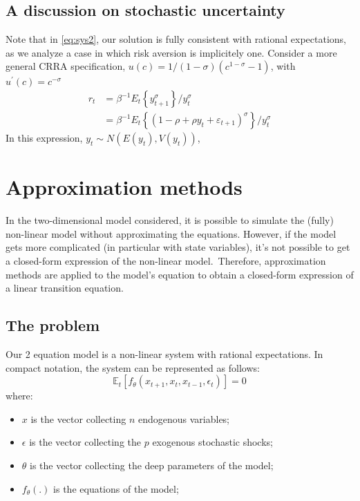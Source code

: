 \documentclass[a4paper,12pt]{article}%
\begin{document}
\subsection{A discussion on stochastic uncertainty}

Note that in \autoref{eq:sys2}, our solution is fully consistent with rational
expectations, as we analyze a case in which risk aversion is implicitely one.
Consider a more general CRRA specification, $u\left(  c\right)  =1/\left(
1-\sigma\right)  \left(  c^{1-\sigma}-1\right)  $, with $u^{\prime}\left(
c\right)  =c^{-\sigma}$
\begin{align*}
r_{t}  & =\beta^{-1}E_{t}\left\{  y_{t+1}^{\sigma}\right\}  /y_{t}^{\sigma}\\
& =\beta^{-1}E_{t}\left\{  \left(  1-\rho+\rho y_{t}+\varepsilon_{t+1}\right)
^{\sigma}\right\}  /y_{t}^{\sigma}%
\end{align*}
In this expression, $y_{t}\sim N(E\left(  y_{t}\right)  ,V\left(
y_{t}\right)  )$,
\[
\]


\newpage

\section{Approximation methods}

In the two-dimensional model considered, it is possible to simulate the
(fully) non-linear model without approximating the equations. However, if the
model gets more complicated (in particular with state variables), it's not
possible to get a closed-form expression of the non-linear model.\ Therefore,
approximation methods are applied to the model's equation to obtain a
closed-form expression of a linear transition equation.

\subsection{The problem}

Our 2 equation model is a non-linear system with rational expectations. In
compact notation, the system can be represented as follows:%
\begin{equation}
\mathbb{E}_{t}\left[  f_{\theta}\left(  x_{t+1},x_{t},x_{t-1},\epsilon
_{t}\right)  \right]  =0 \label{eq non linear system}%
\end{equation}
where:

\begin{itemize}
\item $x$ is the vector collecting $n$ endogenous variables;

\item $\epsilon$ is the vector collecting the $p$ exogenous stochastic shocks;

\item $\theta$ is the vector collecting the deep parameters of the model;

\item $f_{\theta}(.)$ is the equations of the model;
\end{itemize}
\end{document}
